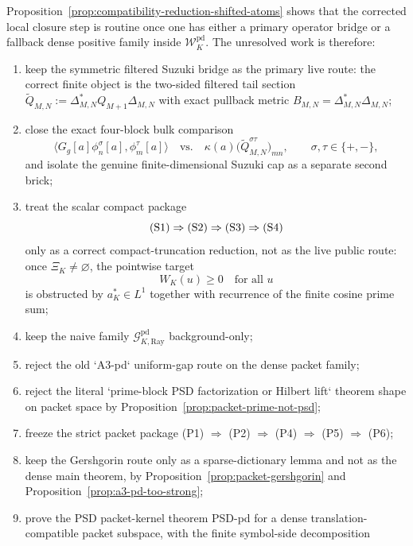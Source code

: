 \begin{remark}\label{rem:compatibility-missing-scalar}
Proposition~\ref{prop:compatibility-reduction-shifted-atoms} shows that the
corrected local closure step is routine once one has either a primary operator
bridge or a fallback dense positive family inside $\mathcal W_K^{\mathrm{pd}}$.
The unresolved work is therefore:
\begin{enumerate}
  \item keep the symmetric filtered Suzuki bridge as the primary live route:
  the correct finite object is the two-sided filtered tail section
  $\widetilde Q_{M,N}:=\Delta_{M,N}^*Q_{M+1}\Delta_{M,N}$ with exact pullback
  metric $B_{M,N}=\Delta_{M,N}^*\Delta_{M,N}$;
  \item close the exact four-block bulk comparison
  \[
    \bigl\langle G_g[a]\phi_n^\sigma[a],\phi_m^\tau[a]\bigr\rangle
    \quad\text{vs.}\quad
    \kappa(a)\bigl(\widetilde Q_{M,N}^{\sigma\tau}\bigr)_{mn},
    \qquad
    \sigma,\tau\in\{+,-\},
  \]
  and isolate the genuine finite-dimensional Suzuki cap as a separate second
  brick;
  \item treat the scalar compact package
  \[
    \textup{(S1)}\Rightarrow\textup{(S2)}\Rightarrow\textup{(S3)}\Rightarrow\textup{(S4)}
  \]
  only as a correct compact-truncation reduction, not as the live public route:
  once $\Xi_K\neq\varnothing$, the pointwise target
  \[
    W_K(u)\ge0 \quad\text{for all }u
  \]
  is obstructed by $a_K^*\in L^1$ together with recurrence of the finite cosine
  prime sum;
  \item keep the naive family $\mathcal G_{K,\mathrm{Ray}}^{\mathrm{pd}}$ background-only;
  \item reject the old `A3-pd` uniform-gap route on the dense packet family;
  \item reject the literal `prime-block PSD factorization or Hilbert lift`
  theorem shape on packet space by Proposition~\ref{prop:packet-prime-not-psd};
  \item freeze the strict packet package
  \textup{(P1)} $\Rightarrow$ \textup{(P2)} $\Rightarrow$ \textup{(P4)}
  $\Rightarrow$ \textup{(P5)} $\Rightarrow$ \textup{(P6)};
  \item keep the Gershgorin route only as a sparse-dictionary lemma and not as
  the dense main theorem, by Proposition~\ref{prop:packet-gershgorin} and
  Proposition~\ref{prop:a3-pd-too-strong};
  \item prove the PSD packet-kernel theorem PSD-pd for a dense
  translation-compatible packet subspace, with the finite symbol-side decomposition

\end{enumerate}
\end{remark}
